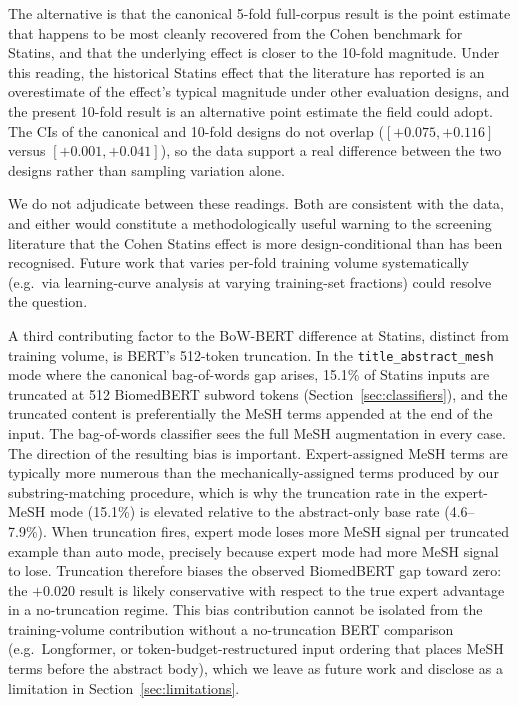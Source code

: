 \documentclass{article}
\begin{document}
The alternative is that the canonical 5-fold full-corpus result is the point estimate that happens to be most cleanly recovered from the Cohen benchmark for Statins, and that the underlying effect is closer to the 10-fold magnitude. Under this reading, the historical Statins effect that the literature has reported \cite{cohen2008,matwin2010} is an overestimate of the effect's typical magnitude under other evaluation designs, and the present 10-fold result is an alternative point estimate the field could adopt. The CIs of the canonical and 10-fold designs do not overlap ($[+0.075, +0.116]$ versus $[+0.001, +0.041]$), so the data support a real difference between the two designs rather than sampling variation alone.

We do not adjudicate between these readings. Both are consistent with the data, and either would constitute a methodologically useful warning to the screening literature that the Cohen Statins effect is more design-conditional than has been recognised. Future work that varies per-fold training volume systematically (e.g.\ via learning-curve analysis at varying training-set fractions) could resolve the question.

A third contributing factor to the BoW-BERT difference at Statins, distinct from training volume, is BERT's 512-token truncation. In the \texttt{title\_abstract\_mesh} mode where the canonical bag-of-words gap arises, 15.1\% of Statins inputs are truncated at 512 BiomedBERT subword tokens (Section~\ref{sec:classifiers}), and the truncated content is preferentially the MeSH terms appended at the end of the input. The bag-of-words classifier sees the full MeSH augmentation in every case. The direction of the resulting bias is important. Expert-assigned MeSH terms are typically more numerous than the mechanically-assigned terms produced by our substring-matching procedure, which is why the truncation rate in the expert-MeSH mode (15.1\%) is elevated relative to the abstract-only base rate (4.6--7.9\%). When truncation fires, expert mode loses more MeSH signal per truncated example than auto mode, precisely because expert mode had more MeSH signal to lose. Truncation therefore biases the observed BiomedBERT gap toward zero: the $+0.020$ result is likely conservative with respect to the true expert advantage in a no-truncation regime. This bias contribution cannot be isolated from the training-volume contribution without a no-truncation BERT comparison (e.g.\ Longformer, or token-budget-restructured input ordering that places MeSH terms before the abstract body), which we leave as future work and disclose as a limitation in Section~\ref{sec:limitations}.
\end{document}
